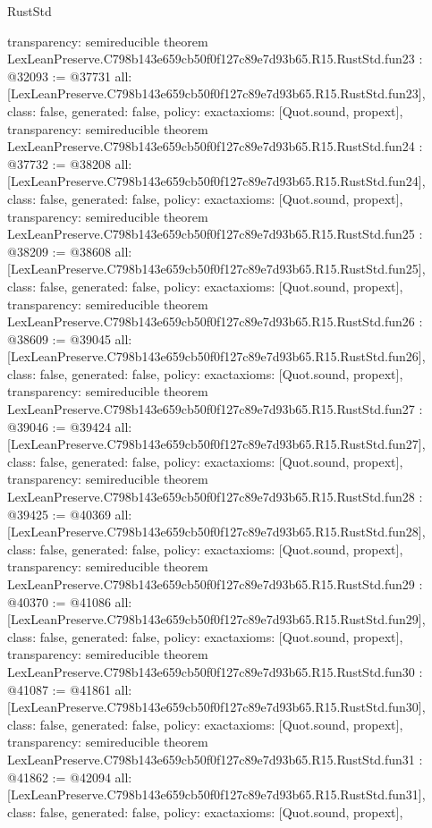 \begin{lexlean}{RustStd}
\begin{coremodule}
{  transparency: semireducible
}
theorem LexLeanPreserve.C798b143e659cb50f0f127c89e7d93b65.R15.RustStd.fun23 : @32093 := @37731 {
  all: [LexLeanPreserve.C798b143e659cb50f0f127c89e7d93b65.R15.RustStd.fun23],
  class: false,
  generated: false,
  policy: exact{axioms: [Quot.sound, propext]},
  transparency: semireducible
}
theorem LexLeanPreserve.C798b143e659cb50f0f127c89e7d93b65.R15.RustStd.fun24 : @37732 := @38208 {
  all: [LexLeanPreserve.C798b143e659cb50f0f127c89e7d93b65.R15.RustStd.fun24],
  class: false,
  generated: false,
  policy: exact{axioms: [Quot.sound, propext]},
  transparency: semireducible
}
theorem LexLeanPreserve.C798b143e659cb50f0f127c89e7d93b65.R15.RustStd.fun25 : @38209 := @38608 {
  all: [LexLeanPreserve.C798b143e659cb50f0f127c89e7d93b65.R15.RustStd.fun25],
  class: false,
  generated: false,
  policy: exact{axioms: [Quot.sound, propext]},
  transparency: semireducible
}
theorem LexLeanPreserve.C798b143e659cb50f0f127c89e7d93b65.R15.RustStd.fun26 : @38609 := @39045 {
  all: [LexLeanPreserve.C798b143e659cb50f0f127c89e7d93b65.R15.RustStd.fun26],
  class: false,
  generated: false,
  policy: exact{axioms: [Quot.sound, propext]},
  transparency: semireducible
}
theorem LexLeanPreserve.C798b143e659cb50f0f127c89e7d93b65.R15.RustStd.fun27 : @39046 := @39424 {
  all: [LexLeanPreserve.C798b143e659cb50f0f127c89e7d93b65.R15.RustStd.fun27],
  class: false,
  generated: false,
  policy: exact{axioms: [Quot.sound, propext]},
  transparency: semireducible
}
theorem LexLeanPreserve.C798b143e659cb50f0f127c89e7d93b65.R15.RustStd.fun28 : @39425 := @40369 {
  all: [LexLeanPreserve.C798b143e659cb50f0f127c89e7d93b65.R15.RustStd.fun28],
  class: false,
  generated: false,
  policy: exact{axioms: [Quot.sound, propext]},
  transparency: semireducible
}
theorem LexLeanPreserve.C798b143e659cb50f0f127c89e7d93b65.R15.RustStd.fun29 : @40370 := @41086 {
  all: [LexLeanPreserve.C798b143e659cb50f0f127c89e7d93b65.R15.RustStd.fun29],
  class: false,
  generated: false,
  policy: exact{axioms: [Quot.sound, propext]},
  transparency: semireducible
}
theorem LexLeanPreserve.C798b143e659cb50f0f127c89e7d93b65.R15.RustStd.fun30 : @41087 := @41861 {
  all: [LexLeanPreserve.C798b143e659cb50f0f127c89e7d93b65.R15.RustStd.fun30],
  class: false,
  generated: false,
  policy: exact{axioms: [Quot.sound, propext]},
  transparency: semireducible
}
theorem LexLeanPreserve.C798b143e659cb50f0f127c89e7d93b65.R15.RustStd.fun31 : @41862 := @42094 {
  all: [LexLeanPreserve.C798b143e659cb50f0f127c89e7d93b65.R15.RustStd.fun31],
  class: false,
  generated: false,
  policy: exact{axioms: [Quot.sound, propext]},
}
\end{coremodule}
\end{lexlean}
